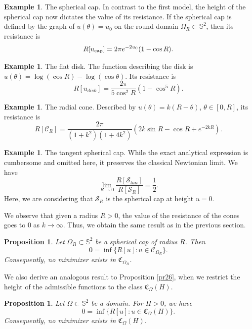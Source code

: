 \documentclass[a4paper,12pt]{amsart}
\theoremstyle{plain}
\newtheorem{proposition}[theorem]{Proposition}
\theoremstyle{definition}
\newtheorem{example}[theorem]{Example}
\def\s{\mathbb S}
\def\S{\mathcal S}
\begin{document}
\begin{example} The spherical cap. In contrast to   the first model,   the height of the spherical cap now dictates the value of its resistance. If the spherical cap is defined by the graph of $ u(\theta) =u_0$ on the round domain $\Omega_R\subset\s^2$, then its resistance is
$$ 
 R[u_{\rm cap}] = 2\pi e^{-2u_0} (1 - \cos R).$$
 
 \end{example}
 
\begin{example} The flat disk. The function describing the disk is $ u (\theta) = \log(\cos R) - \log(\cos \theta)$. Its resistance is 
$$
 R[u_{disk}] = \frac{2\pi}{5\cos^2 R} (1 - \cos^5 R).
$$
 \end{example}
 
 \begin{example} The radial cone. Described by  $u(\theta) = k(R - \theta)$, $\theta\in [0,R]$, its resistance  is
\[ R[\mathcal{C}_R] = \frac{2\pi}{(1 + k^2)(1 + 4k^2)} \left( 2k \sin R - \cos R + e^{-2kR} \right).\]
 

\end{example}

\begin{example} The tangent spherical cap. While the exact analytical expression is cumbersome and omitted here,   it preserves the classical Newtonian limit.  We have 
$$\lim_{R\to 0}\frac{R[\S_{tan}]}{R[\S_R]}=\frac12.$$
Here, we are considering that $\S_R$ is the spherical cap at height $u=0$. 
\end{example}
 
We observe that given a radius $R>0$, the value of the resistance of the cones goes to $0$ as $k\to\infty$. Thus, we obtain the same result as in the previous section. 

\begin{proposition} 
Let $\Omega_R\subset\s^2$ be a spherical cap of radius $R$. Then 
$$0=\inf \{R[u]\colon u\in\mathcal{C}_{\Omega_R}\}.$$
 Consequently, no minimizer exists in $\mathfrak{C}_{\Omega_R}$.
\end{proposition}

We also derive an analogous result to Proposition \ref{pr26}, when we restrict the height of the admissible functions to the class 
 $\mathfrak{C}_{\Omega}(H)$.
 

 \begin{proposition} \label{tile2}
Let $\Omega\subset\s^2$ be a domain. For $H>0$, we have 
 $$0= \inf \{R[u] \colon u \in \mathfrak{C}_{\Omega}(H)\}.$$ 
 Consequently, no minimizer exists in $\mathfrak{C}_{\Omega}(H)$.
\end{proposition}
\end{document}
